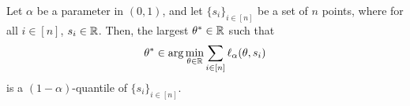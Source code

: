 \begin{lemma}[\cite{KB78}]
\label{lem: quant-reg}
    Let $\alpha$ be a parameter in $(0,1)$, and let $\{s_i\}_{i \in [n]}$ be a set of $n$ points, where for all $i \in [n]$, $s_i \in \mathbb{R}$.
    Then, the largest $\theta^* \in \mathbb{R}$ such that 
    \[
    \theta^* \in \arg\min_{\theta \in \mathbb{R}} \sum_{i \in [n]} \ell_{\alpha}(\theta, s_i)
    \]
    is a $(1-\alpha)$-quantile of $\{s_i\}_{i \in [n]}$.
\end{lemma}
